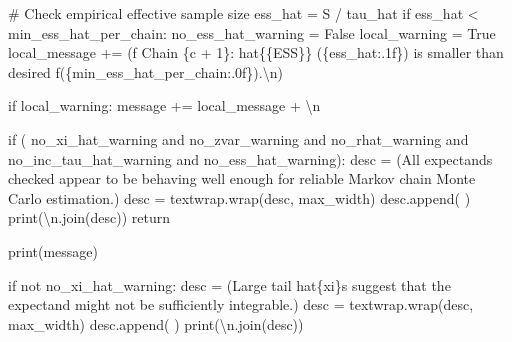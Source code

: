 \documentclass[
  letterpaper,
  DIV=11,
  numbers=noendperiod]{scrartcl}
\newenvironment{Shaded}{\begin{snugshade}}{\end{snugshade}}
\newcommand{\BuiltInTok}[1]{\textcolor[rgb]{0.00,0.23,0.31}{#1}}
\newcommand{\CharTok}[1]{\textcolor[rgb]{0.13,0.47,0.30}{#1}}
\newcommand{\CommentTok}[1]{\textcolor[rgb]{0.37,0.37,0.37}{#1}}
\newcommand{\ControlFlowTok}[1]{\textcolor[rgb]{0.00,0.23,0.31}{#1}}
\newcommand{\DecValTok}[1]{\textcolor[rgb]{0.68,0.00,0.00}{#1}}
\newcommand{\KeywordTok}[1]{\textcolor[rgb]{0.00,0.23,0.31}{#1}}
\newcommand{\NormalTok}[1]{\textcolor[rgb]{0.00,0.23,0.31}{#1}}
\newcommand{\OperatorTok}[1]{\textcolor[rgb]{0.37,0.37,0.37}{#1}}
\newcommand{\SpecialCharTok}[1]{\textcolor[rgb]{0.37,0.37,0.37}{#1}}
\newcommand{\SpecialStringTok}[1]{\textcolor[rgb]{0.13,0.47,0.30}{#1}}
\newcommand{\StringTok}[1]{\textcolor[rgb]{0.13,0.47,0.30}{#1}}
\newcommand{\VariableTok}[1]{\textcolor[rgb]{0.07,0.07,0.07}{#1}}
\begin{document}
\begin{Shaded}
\begin{Highlighting}[]
      \CommentTok{\# Check empirical effective sample size}
\NormalTok{      ess\_hat }\OperatorTok{=}\NormalTok{ S }\OperatorTok{/}\NormalTok{ tau\_hat}
      \ControlFlowTok{if}\NormalTok{ ess\_hat }\OperatorTok{\textless{}}\NormalTok{ min\_ess\_hat\_per\_chain:}
\NormalTok{        no\_ess\_hat\_warning }\OperatorTok{=} \VariableTok{False}
\NormalTok{        local\_warning }\OperatorTok{=} \VariableTok{True}
\NormalTok{        local\_message }\OperatorTok{+=}\NormalTok{ (}\SpecialStringTok{f\textquotesingle{}  Chain }\SpecialCharTok{\{}\NormalTok{c }\OperatorTok{+} \DecValTok{1}\SpecialCharTok{\}}\SpecialStringTok{: hat}\CharTok{\{\{}\SpecialStringTok{ESS}\CharTok{\}\}}\SpecialStringTok{ (}\SpecialCharTok{\{}\NormalTok{ess\_hat}\SpecialCharTok{:.1f\}}\SpecialStringTok{) \textquotesingle{}}
                          \StringTok{\textquotesingle{}is smaller than desired \textquotesingle{}}
                          \SpecialStringTok{f\textquotesingle{}(}\SpecialCharTok{\{}\NormalTok{min\_ess\_hat\_per\_chain}\SpecialCharTok{:.0f\}}\SpecialStringTok{).}\CharTok{\textbackslash{}n}\SpecialStringTok{\textquotesingle{}}\NormalTok{)}
    
    \ControlFlowTok{if}\NormalTok{ local\_warning:}
\NormalTok{      message }\OperatorTok{+=}\NormalTok{ local\_message }\OperatorTok{+} \StringTok{\textquotesingle{}}\CharTok{\textbackslash{}n}\StringTok{\textquotesingle{}}
  
  \ControlFlowTok{if}\NormalTok{ (    no\_xi\_hat\_warning }\KeywordTok{and}\NormalTok{ no\_zvar\_warning}
      \KeywordTok{and}\NormalTok{ no\_rhat\_warning   }\KeywordTok{and}\NormalTok{ no\_inc\_tau\_hat\_warning}
      \KeywordTok{and}\NormalTok{ no\_ess\_hat\_warning):}
\NormalTok{    desc }\OperatorTok{=}\NormalTok{ (}\StringTok{\textquotesingle{}All expectands checked appear to be behaving well enough \textquotesingle{}}
            \StringTok{\textquotesingle{}for reliable Markov chain Monte Carlo estimation.\textquotesingle{}}\NormalTok{)}
\NormalTok{    desc }\OperatorTok{=}\NormalTok{ textwrap.wrap(desc, max\_width)}
\NormalTok{    desc.append(}\StringTok{\textquotesingle{} \textquotesingle{}}\NormalTok{)}
    \BuiltInTok{print}\NormalTok{(}\StringTok{\textquotesingle{}}\CharTok{\textbackslash{}n}\StringTok{\textquotesingle{}}\NormalTok{.join(desc))}
    \ControlFlowTok{return}
  
  \BuiltInTok{print}\NormalTok{(message)}
  
  \ControlFlowTok{if} \KeywordTok{not}\NormalTok{ no\_xi\_hat\_warning:}
\NormalTok{    desc }\OperatorTok{=}\NormalTok{ (}\StringTok{\textquotesingle{}Large tail hat}\SpecialCharTok{\{xi\}}\StringTok{s suggest that the expectand \textquotesingle{}}
            \StringTok{\textquotesingle{}might not be sufficiently integrable.\textquotesingle{}}\NormalTok{)}
\NormalTok{    desc }\OperatorTok{=}\NormalTok{ textwrap.wrap(desc, max\_width)}
\NormalTok{    desc.append(}\StringTok{\textquotesingle{} \textquotesingle{}}\NormalTok{)}
    \BuiltInTok{print}\NormalTok{(}\StringTok{\textquotesingle{}}\CharTok{\textbackslash{}n}\StringTok{\textquotesingle{}}\NormalTok{.join(desc))}
  

\end{Highlighting}
\end{Shaded}
\end{document}
